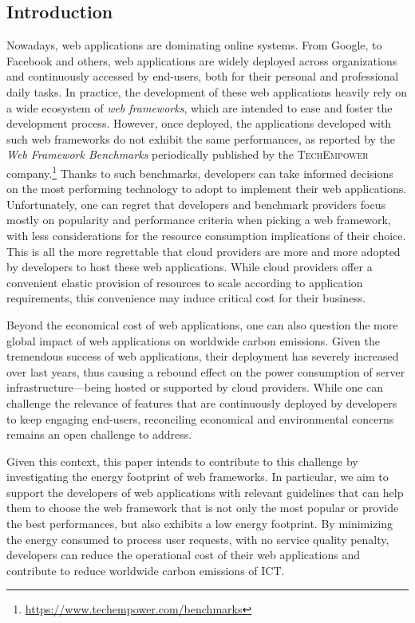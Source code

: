 \newpage
\subsection{Introduction}
Nowadays, web applications are dominating online systems.
From Google, to Facebook and others, web applications are widely deployed across organizations and continuously accessed by end-users, both for their personal and professional daily tasks.
In practice, the development of these web applications heavily rely on a wide ecosystem of \emph{web frameworks}, which are intended to ease and foster the development process.
However, once deployed, the applications developed with such web frameworks do not exhibit the same performances, as reported by the \emph{Web Framework Benchmarks} periodically published by the \textsc{TechEmpower} company.\footnote{\url{https://www.techempower.com/benchmarks}}
Thanks to such benchmarks, developers can take informed decisions on the most performing technology to adopt to implement their web applications.
Unfortunately, one can regret that developers and benchmark providers focus mostly on popularity and performance criteria when picking a web framework, with less considerations for the resource consumption implications of their choice.
This is all the more regrettable that cloud providers are more and more adopted by developers to host these web applications.
While cloud providers offer a convenient elastic provision of resources to scale according to application requirements, this convenience may induce critical cost for their business.

Beyond the economical cost of web applications, one can also question the more global impact of web applications on worldwide carbon emissions.
Given the tremendous success of web applications, their deployment has severely increased over last years, thus causing a rebound effect on the power consumption of server infrastructure---being hosted or supported by cloud providers.
While one can challenge the relevance of features that are continuously deployed by developers to keep engaging end-users, reconciling economical and environmental concerns remains an open challenge to address.

Given this context, this paper intends to contribute to this challenge by investigating the energy footprint of web frameworks.
In particular, we aim to support the developers of web applications with relevant guidelines that can help them to choose the web framework that is not only the most popular or provide the best performances, but also exhibits a low energy footprint.
By minimizing the energy consumed to process user requests, with no service quality penalty, developers can reduce the operational cost of their web applications and contribute to reduce worldwide carbon emissions of ICT.

